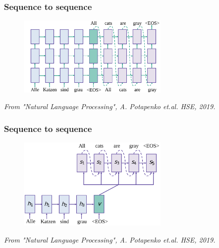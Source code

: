 \documentclass{tum-presentation}
\begin{document}
\begin{frame}
	\frametitle{Sequence to sequence}
	\begin{figure}
		\centering
		\includegraphics[width=0.65\textwidth,keepaspectratio=true]{tum-resources/images/seq2seq_3.png}
		\label{fig:seq2seq_3}
	\end{figure}
	\begin{flushright}
	\textit{	From "Natural Language Processing", A. Potapenko et.al. HSE, 2019. }
	\end{flushright}

\end{frame}

\begin{frame}
	\frametitle{Sequence to sequence}
	\begin{figure}
		\centering
		\includegraphics[width=0.65\textwidth,keepaspectratio=true]{tum-resources/images/seq2seq_4.png}
		\label{fig:seq2seq_4}
	\end{figure}
	\begin{flushright}
	\textit{	From "Natural Language Processing", A. Potapenko et.al. HSE, 2019. }
	\end{flushright}
\end{frame}
\end{document}
